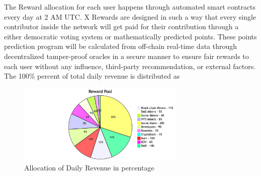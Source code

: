 \documentclass[letterpaper,11pt]{article}
\begin{document}
The Reward allocation for each user happens through automated smart contracts every day at 2 AM UTC. X Rewards are designed in such a way that every single contributor inside the network will get paid for their contribution through a either democratic voting system or mathematically predicted points. These points prediction program will be calculated from off-chain real-time data through decentralized tamper-proof oracles in a secure  manner to ensure fair rewards to each user without any influence, third-party recommendation, or external factors. \\

The 100\% percent of total daily revenue is distributed as \\
\begin{figure}[H]
\begin{center}
\includegraphics[width=8cm]{global-reward}
\caption{Allocation of Daily Revenue in percentage}
\end{center}
\end{figure}
\end{document}
